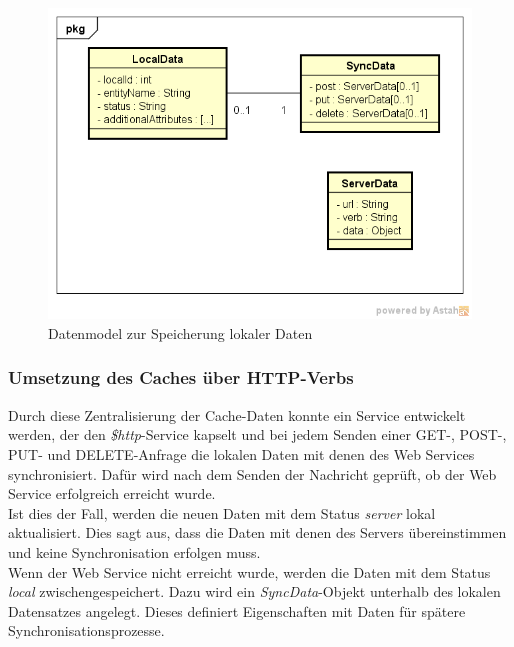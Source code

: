 \begin{figure}[h]
\centering
\includegraphics[width=0.8\linewidth]{content/images/DataModel-Cache-SPA}
\caption{Datenmodel zur Speicherung lokaler Daten}
\label{pic:DataModel-Cache-SPA}
\end{figure}

\subsubsection*{Umsetzung des Caches über HTTP-Verbs}
\label{sssec:Http-Verbs}
Durch diese Zentralisierung der Cache-Daten konnte ein Service entwickelt werden, der den \textit{\$http}-Service kapselt und bei jedem Senden einer GET-, POST-, PUT- und DELETE-Anfrage die lokalen Daten mit denen des Web Services synchronisiert. Dafür wird nach dem Senden der Nachricht geprüft, ob der Web Service erfolgreich erreicht wurde.\\
Ist dies der Fall, werden die neuen Daten mit dem Status \textit{server} lokal aktualisiert. Dies sagt aus, dass die Daten mit denen des Servers übereinstimmen und keine Synchronisation erfolgen muss.\\
Wenn der Web Service nicht erreicht wurde, werden die Daten mit dem Status \textit{local} zwischengespeichert. Dazu wird ein \textit{SyncData}-Objekt unterhalb des lokalen Datensatzes angelegt. Dieses definiert Eigenschaften mit Daten für spätere Synchronisationsprozesse.


